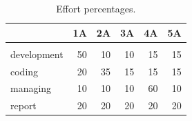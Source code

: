 \documentclass[11pt, twocolumn]{article}
\begin{document}
\begin{table}[htbp!]
  \centering
  \caption{\label{t:effort} Effort percentages.}
  \begin{tabular}{lrrrrr}
     & 1A & 2A & 3A & 4A & 5A  \\
    \hline \hline \\ [-2ex]
    development & 50 & 10 & 10 & 15 & 15 \\
    coding &  20 & 35 & 15 & 15 & 15 \\
    managing & 10 & 10 & 10 & 60 & 10 \\
    report & 20 & 20 & 20 & 20 & 20
  \end{tabular}
\end{table}






\small

\end{document}
